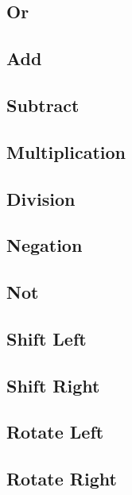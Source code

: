 \documentclass{article}
\begin{document}
\subsection{Or}
\subsection{Add}
\subsection{Subtract}
\subsection{Multiplication}
\subsection{Division}
\subsection{Negation}
\subsection{Not}
\subsection{Shift Left}
\subsection{Shift Right}
\subsection{Rotate Left}
\subsection{Rotate Right}
\end{document}
